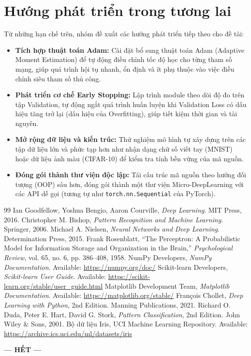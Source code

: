 \documentclass[12pt,a4paper]{report}
\begin{document}
\section{Hướng phát triển trong tương lai}
Từ những hạn chế trên, nhóm đề xuất các hướng phát triển tiếp theo cho đề tài:
\begin{itemize}
    \item \textbf{Tích hợp thuật toán Adam:} Cài đặt bổ sung thuật toán Adam (Adaptive Moment Estimation) để tự động điều chỉnh tốc độ học cho từng tham số mạng, giúp quá trình hội tụ nhanh, ổn định và ít phụ thuộc vào việc điều chỉnh siêu tham số thủ công.
    \item \textbf{Phát triển cơ chế Early Stopping:} Lập trình module theo dõi độ đo trên tập Validation, tự động ngắt quá trình huấn luyện khi Validation Loss có dấu hiệu tăng trở lại (dấu hiệu của Overfitting), giúp tiết kiệm thời gian và tài nguyên.
    \item \textbf{Mở rộng dữ liệu và kiến trúc:} Thử nghiệm mô hình tự xây dựng trên các tập dữ liệu lớn và phức tạp hơn như nhận dạng chữ số viết tay (MNIST) hoặc dữ liệu ảnh màu (CIFAR-10) để kiểm tra tính bền vững của mã nguồn.
    \item \textbf{Đóng gói thành thư viện độc lập:} Tái cấu trúc mã nguồn theo hướng đối tượng (OOP) sâu hơn, đóng gói thành một thư viện Micro-DeepLearning với các API dễ gọi (tương tự như \texttt{torch.nn.Sequential} của PyTorch).
\end{itemize}

\begin{thebibliography}{99}
     Ian Goodfellow, Yoshua Bengio, Aaron Courville, \textit{Deep Learning}. MIT Press, 2016.
     Christopher M. Bishop, \textit{Pattern Recognition and Machine Learning}. Springer, 2006.
     Michael A. Nielsen, \textit{Neural Networks and Deep Learning}. Determination Press, 2015.
     Frank Rosenblatt, ``The Perceptron: A Probabilistic Model for Information Storage and Organization in the Brain,'' \textit{Psychological Review}, vol. 65, no. 6, pp. 386–408, 1958.
     NumPy Developers, \textit{NumPy Documentation}. Available: \url{https://numpy.org/doc/}
     Scikit-learn Developers, \textit{Scikit-learn User Guide}. Available: \url{https://scikit-learn.org/stable/user_guide.html}
     Matplotlib Development Team, \textit{Matplotlib Documentation}. Available: \url{https://matplotlib.org/stable/}
     François Chollet, \textit{Deep Learning with Python}, 2nd Edition. Manning Publications, 2021.
     Richard O. Duda, Peter E. Hart, David G. Stork, \textit{Pattern Classification}, 2nd Edition. John Wiley \& Sons, 2001.
     Bộ dữ liệu Iris, UCI Machine Learning Repository. Available: \url{https://archive.ics.uci.edu/ml/datasets/iris}
\end{thebibliography}

\begin{center}
    \vspace{1cm}
    \textbf{--- HẾT ---}
\end{center}
\end{document}
